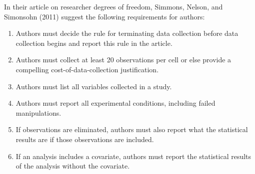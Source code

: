 \documentclass[12pt] {article}
\begin{document}
In their article on researcher degrees of freedom, Simmons, Nelson, and
Simonsohn (2011) suggest the following requirements for authors:

\begin{enumerate}
\def\labelenumi{\arabic{enumi}.}
\item
  Authors must decide the rule for terminating data collection before
  data collection begins and report this rule in the article.
\item
  Authors must collect at least 20 observations per cell or else provide
  a compelling cost-of-data-collection justification.
\item
  Authors must list all variables collected in a study.
\item
  Authors must report all experimental conditions, including failed
  manipulations.
\item
  If observations are eliminated, authors must also report what the
  statistical results are if those observations are included.
\item
  If an analysis includes a covariate, authors must report the
  statistical results of the analysis without the covariate.
\end{enumerate}
\end{document}
